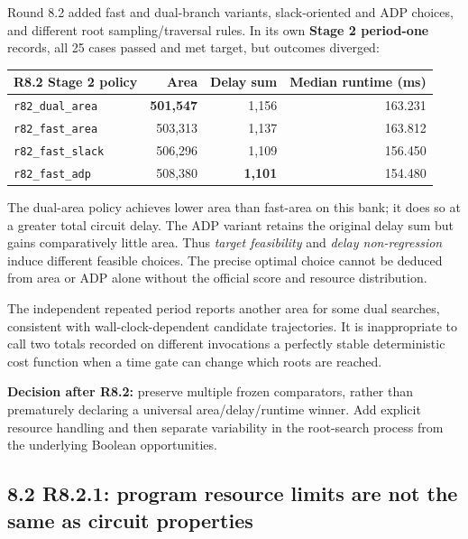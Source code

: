 \documentclass[a4paper,10pt]{article}
\theoremstyle{definition}
\theoremstyle{remark}
\begin{document}
Round 8.2 added fast and dual-branch variants, slack-oriented and ADP choices, and different root sampling/traversal rules. In its own \textbf{Stage 2 period-one} records, all 25 cases passed and met target, but outcomes diverged:

\begin{longtable}[]{@{}lrrr@{}}
\toprule\noalign{}
R8.2 Stage 2 policy & Area & Delay sum & Median runtime (ms) \\
\midrule\noalign{}
\endhead
\bottomrule\noalign{}
\endlastfoot
\texttt{r82\_dual\_area} & \textbf{501,547} & 1,156 & 163.231 \\
\texttt{r82\_fast\_area} & 503,313 & 1,137 & 163.812 \\
\texttt{r82\_fast\_slack} & 506,296 & 1,109 & 156.450 \\
\texttt{r82\_fast\_adp} & 508,380 & \textbf{1,101} & 154.480 \\
\end{longtable}

The dual-area policy achieves lower area than fast-area on this bank; it does so at a greater total circuit delay. The ADP variant retains the original delay sum but gains comparatively little area. Thus \emph{target feasibility} and \emph{delay non-regression} induce different feasible choices. The precise optimal choice cannot be deduced from area or ADP alone without the official score and resource distribution.

The independent repeated period reports another area for some dual searches, consistent with wall-clock-dependent candidate trajectories. It is inappropriate to call two totals recorded on different invocations a perfectly stable deterministic cost function when a time gate can change which roots are reached.

\begin{tcolorbox}[colback=ResearchBlue!6!white,colframe=ResearchSlate!55!white,boxrule=0.65pt,arc=1mm,breakable]
\textbf{Decision after R8.2:} preserve multiple frozen comparators, rather than prematurely declaring a universal area/delay/runtime winner. Add explicit resource handling and then separate variability in the root-search process from the underlying Boolean opportunities.
\end{tcolorbox}

\subsection{8.2 R8.2.1: program resource limits are not the same as circuit properties}\label{r8.2.1-program-resource-limits-are-not-the-same-as-circuit-properties}
\end{document}

